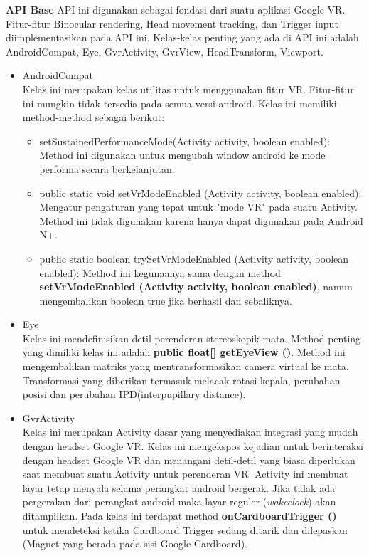 \documentclass[a4paper,twoside]{article}
\begin{document}
\begin{enumerate}
\textbf{API Base}
\label{sec:api_base}
\cite{google_vr_developers}
API ini digunakan sebagai fondasi dari suatu aplikasi Google VR. Fitur-fitur Binocular rendering, Head movement tracking, dan Trigger input diimplementasikan pada API ini. Kelas-kelas penting yang ada di API ini adalah AndroidCompat, Eye, GvrActivity, GvrView, HeadTransform, Viewport.
\begin{itemize}
	\item AndroidCompat\\
Kelas ini merupakan kelas utilitas untuk menggunakan fitur VR. Fitur-fitur ini mungkin tidak tersedia pada semua versi android. Kelas ini memiliki method-method sebagai berikut:
\begin{itemize}
	\item setSustainedPerformanceMode(Activity activity, boolean enabled): \\
	Method ini digunakan untuk mengubah window android ke mode performa secara berkelanjutan.
	\item public static void setVrModeEnabled (Activity activity, boolean enabled): \\
	Mengatur pengaturan yang tepat untuk "mode VR" pada suatu Activity. Method ini tidak digunakan karena hanya dapat digunakan pada Android N+.
	\item public static boolean trySetVrModeEnabled (Activity activity, boolean enabled): 
	Method ini kegunaanya sama dengan method \textbf{setVrModeEnabled (Activity activity, boolean enabled)}, namun mengembalikan boolean true jika berhasil dan sebaliknya.
\end{itemize}
	\item Eye\\
Kelas ini mendefinisikan detil perenderan stereoskopik mata. Method penting yang dimiliki kelas ini adalah \textbf{public float[] getEyeView ()}. Method ini mengembalikan matriks yang mentransformasikan camera virtual ke mata. Transformasi yang diberikan termasuk melacak rotasi kepala, perubahan posisi dan perubahan IPD(interpupillary distance).
	\item GvrActivity\\
Kelas ini merupakan Activity dasar yang menyediakan integrasi yang mudah dengan headset Google VR. Kelas ini mengekspos kejadian untuk berinteraksi dengan headset Google VR dan menangani detil-detil yang biasa diperlukan saat membuat suatu Activity untuk perenderan VR. Activity ini membuat layar tetap menyala selama perangkat android bergerak. Jika tidak ada pergerakan dari perangkat android maka layar reguler (\textit{wakeclock}) akan ditampilkan. Pada kelas ini terdapat method \textbf{onCardboardTrigger ()} untuk mendeteksi ketika Cardboard Trigger sedang ditarik dan dilepaskan (Magnet yang berada pada sisi Google Cardboard).

\end{itemize}
\end{enumerate}
\end{document}
